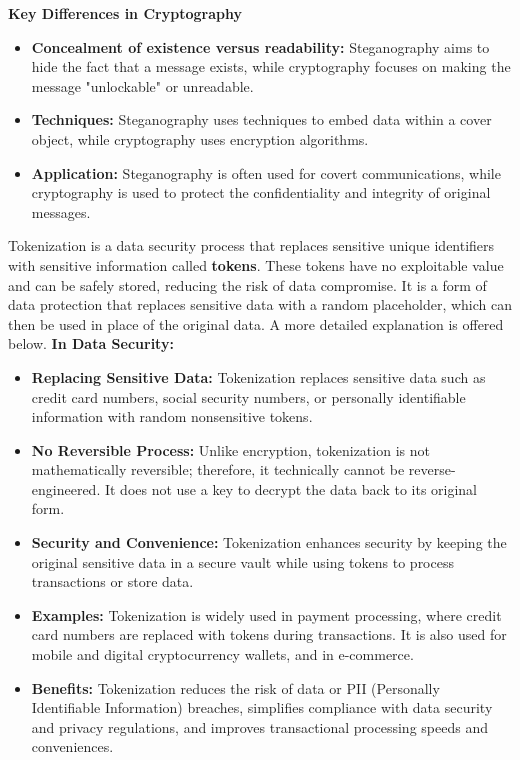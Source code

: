 \textbf{Key Differences in Cryptography}
\begin{itemize}
    \item \textbf{Concealment of existence versus readability:} Steganography aims to hide the fact that a message exists, while cryptography focuses on making the message "unlockable" or unreadable.
    \item \textbf{Techniques:} Steganography uses techniques to embed data within a cover object, while cryptography uses encryption algorithms.
    \item \textbf{Application:} Steganography is often used for covert communications, while cryptography is used to protect the confidentiality and integrity of original messages.
\end{itemize}

 Tokenization is a data security process that replaces sensitive unique identifiers with sensitive information called \textbf{tokens}. These tokens have no exploitable value and can be safely stored, reducing the risk of data compromise. It is a form of data protection that replaces sensitive data with a random placeholder, which can then be used in place of the original data. A more detailed explanation is offered below.
\textbf{In Data Security:}
\begin{itemize}
    \item \textbf{Replacing Sensitive Data:} Tokenization replaces sensitive data such as credit card numbers, social security numbers, or personally identifiable information with random nonsensitive tokens.
    \item \textbf{No Reversible Process:} Unlike encryption, tokenization is not mathematically reversible; therefore, it technically cannot be reverse-engineered. It does not use a key to decrypt the data back to its original form.
    \item \textbf{Security and Convenience:} Tokenization enhances security by keeping the original sensitive data in a secure vault while using tokens to process transactions or store data.
    \item \textbf{Examples:} Tokenization is widely used in payment processing, where credit card numbers are replaced with tokens during transactions. It is also used for mobile and digital cryptocurrency wallets, and in e-commerce.
    \item \textbf{Benefits:} Tokenization reduces the risk of data or PII (Personally Identifiable Information) breaches, simplifies compliance with data security and privacy regulations, and improves transactional processing speeds and conveniences.
\end{itemize}

